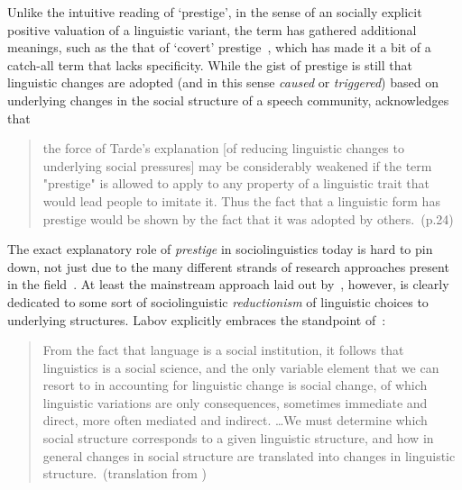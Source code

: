 Unlike the intuitive reading of `prestige', in the sense of an socially explicit positive valuation of a linguistic variant, the term has gathered additional meanings, such as the that of `covert' prestige~\citep{Trudgill1972}, which has made it a bit of a catch-all term that lacks specificity.
While the gist of prestige is still that linguistic changes are adopted (and in this sense \emph{caused} or \emph{triggered}) based on underlying changes in the social structure of a speech community, \citet{Labov2001} acknowledges that

\begin{quote}
the force of Tarde's explanation [of reducing linguistic changes to underlying social pressures] may be considerably weakened if the term "prestige" is allowed to apply to any property of a linguistic trait that would lead people to imitate it. Thus the fact that a linguistic form has prestige would be shown by the fact that it was adopted by others.~(p.24)
\end{quote}

\citep{Sankoff1988,Armstrong2007}

The exact explanatory role of \emph{prestige} in sociolinguistics today is hard to pin down, not just due to the many different strands of research approaches present in the field~\citep{Tagliamonte2015}. At least the mainstream approach laid out by~\citet{Labov2001}, however, is clearly dedicated to some sort of sociolinguistic \emph{reductionism} of linguistic choices to underlying structures. Labov explicitly embraces the standpoint of~\citet{Meillet1926}:


\begin{quote}
From the fact that language is a social institution, it follows that linguistics is a social science, and the only variable element that we can resort to in accounting for linguistic change is social change, of which linguistic variations are only consequences, sometimes immediate and direct, more often mediated and indirect. \ldots We must determine which social structure corresponds to a given linguistic structure, and how in general changes in social structure are translated into changes in linguistic structure.~(translation from \citealt[p.22-23]{Labov2001})
\end{quote}

